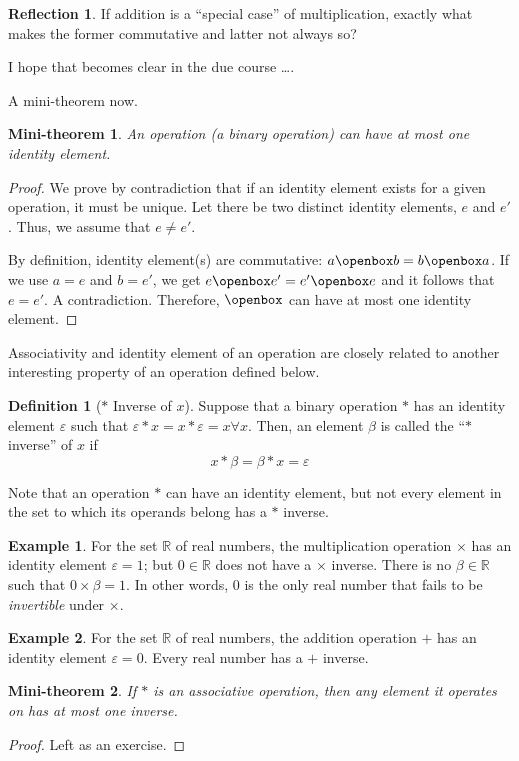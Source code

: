 \documentclass[english,notitlepage,smartquotes]{hgbreport}
\theoremstyle{definition}
\newtheorem{definition}{Definition}
\theoremstyle{definition}
\theoremstyle{remark}
\theoremstyle{definition}
\newtheorem{example}{Example}
\theoremstyle{plain}
\newtheorem{mini-theorem}{Mini-theorem}
\theoremstyle{definition}
\newtheorem{reflection}{Reflection}
\begin{document}
\begin{reflection}
If addition is a ``special case'' of multiplication, exactly what makes the former commutative and latter not always so?

I hope that becomes clear in the due course \dots.
\end{reflection}

A mini-theorem now.
\begin{mini-theorem}
An operation (a binary operation) can have at most one identity element.
\end{mini-theorem}
\begin{proof}
We prove by contradiction that if an identity element exists for a given operation, it must be unique. Let there be two distinct identity elements, $e$ and $e'$. Thus, we assume that $e\ne e'$.

By definition, identity element(s) are commutative: $a\openbox b=b\openbox a$. If we use $a=e$ and $b=e'$, we get $e\openbox e'=e'\openbox e$ and it follows that $e=e'$. A contradiction. Therefore, $\openbox$ can have at most one identity element.
\end{proof}

Associativity and identity element of an operation are closely related to another interesting property of an operation defined below.

\begin{definition}[$*$ Inverse of $x$] 
Suppose that a binary operation $*$ has an identity element $\varepsilon$ such that $\varepsilon*x=x*\varepsilon=x\forall x$. Then, an element $\beta$ is called the ``$*$ inverse'' of $x$ if 
$$
x*\beta=\beta*x=\varepsilon
$$
\label{def:*-inverse}
\end{definition}

Note that an operation $*$ can have an identity element, but not every element in the set to which its operands belong has a $*$ inverse.
\begin{example} For the set $\mathbb{R}$ of real numbers, the multiplication operation $\times$ has an identity element $\varepsilon=1$; but $0\in\mathbb{R}$ does not have a $\times$ inverse. There is no $\beta\in\mathbb{R}$ such that $0\times\beta=1$. In other words, $0$ is the only real number that fails to be \emph{invertible} under $\times$. 
\end{example}
\begin{example} For the set $\mathbb{R}$ of real numbers, the addition operation $+$ has an identity element $\varepsilon=0$. Every real number has a $+$ inverse.
\end{example}
\begin{mini-theorem}
If $*$ is an associative operation, then any element it operates on has at most one inverse.
\end{mini-theorem}
\begin{proof}
Left as an exercise.
\end{proof}
\end{document}

